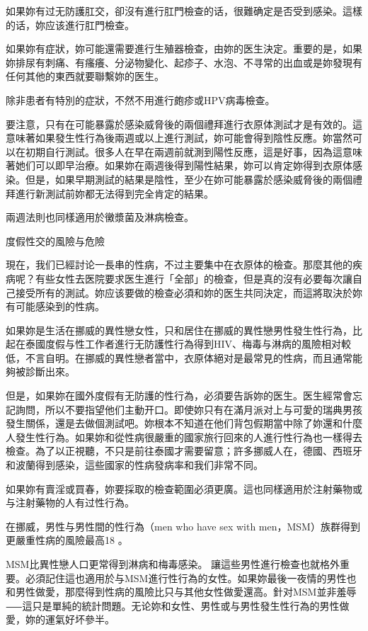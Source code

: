 \documentclass[12pt,UTF8]{ctexbook}
\begin{document}
如果妳有过无防護肛交，卻沒有進行肛門檢查的话，很難确定是否受到感染。這樣的话，妳应该進行肛門檢查。

如果妳有症狀，妳可能還需要進行生殖器檢查，由妳的医生決定。重要的是，如果妳排尿有刺痛、有瘙癢、分泌物變化、起疹子、水泡、不寻常的出血或是妳發現有任何其他的東西就要聯繫妳的医生。

除非患者有特別的症狀，不然不用進行皰疹或HPV病毒檢查。

要注意，只有在可能暴露於感染威脅後的兩個禮拜進行衣原体測試才是有效的。這意味著如果發生性行為後兩週或以上進行測試，妳可能會得到陰性反應。妳當然可以在初期自行測試。很多人在早在兩週前就測到陽性反應，這是好事，因為這意味著她们可以即早治療。如果妳在兩週後得到陽性結果，妳可以肯定妳得到衣原体感染。但是，如果早期測試的結果是陰性，至少在妳可能暴露於感染威脅後的兩個禮拜進行新測試前妳都无法得到完全肯定的結果。

兩週法則也同樣適用於黴漿菌及淋病檢查。





度假性交的風險与危險




現在，我们已經討论一長串的性病，不过主要集中在衣原体的檢查。那麼其他的疾病呢？有些女性去医院要求医生進行「全部」的檢查，但是真的沒有必要每次讓自己接受所有的測試。妳应该要做的檢查必須和妳的医生共同決定，而這將取決於妳有可能感染到的性病。

如果妳是生活在挪威的異性戀女性，只和居住在挪威的異性戀男性發生性行為，比起在泰國度假与性工作者進行无防護性行為得到HIV、梅毒与淋病的風險相对較低，不言自明。在挪威的異性戀者當中，衣原体絕对是最常見的性病，而且通常能夠被診斷出來。

但是，如果妳在國外度假有无防護的性行為，必須要告訴妳的医生。医生經常會忘記詢問，所以不要指望他们主動开口。即使妳只有在滿月派对上与可愛的瑞典男孩發生關係，還是去做個測試吧。妳根本不知道在他们背包假期當中除了妳還和什麼人發生性行為。如果妳和從性病很嚴重的國家旅行回來的人進行性行為也一樣得去檢查。為了以正視聽，不只是前往泰國才需要留意；許多挪威人在，德國、西班牙和波蘭得到感染，這些國家的性病發病率和我们非常不同。

如果妳有賣淫或買春，妳要採取的檢查範圍必須更廣。這也同樣適用於注射藥物或与注射藥物的人有过性行為。

在挪威，男性与男性間的性行為（men who have sex with men，MSM）族群得到更嚴重性病的風險最高18 。

MSM比異性戀人口更常得到淋病和梅毒感染。 讓這些男性進行檢查也就格外重要。必須記住這也適用於与MSM進行性行為的女性。如果妳最後一夜情的男性也和男性做愛，那麼得到性病的風險比只与其他女性做愛還高。針对MSM並非羞辱⸺這只是單純的統計問題。无论妳和女性、男性或与男性發生性行為的男性做愛，妳的運氣好坏參半。
\end{document}
